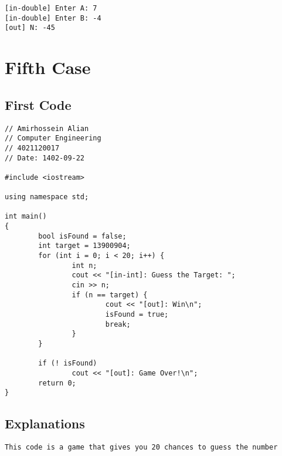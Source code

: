 \documentclass[12pt]{article}
\begin{document}
    \begin{tcolorbox}[breakable, size=fbox, boxrule=1pt, pad at break*=1mm, colback=cellbackground!5!white, colframe=gray!75!black, title=Test Case 3]
\begin{Verbatim}[commandchars=\\\{\}]
[in-double] Enter A: 7
[in-double] Enter B: -4
[out] N: -45
\end{Verbatim}
\end{tcolorbox}

\pagebreak

  \section{Fifth Case}

        \subsection{First Code}
   \begin{tcolorbox}[breakable, size=fbox, boxrule=1pt, pad at break*=1mm, colback=cellbackground, colframe=cellborder]
\begin{verbatim}
// Amirhossein Alian
// Computer Engineering
// 4021120017
// Date: 1402-09-22

#include <iostream>

using namespace std;

int main()
{
        bool isFound = false;
        int target = 13900904;
        for (int i = 0; i < 20; i++) {
                int n;
                cout << "[in-int]: Guess the Target: ";
                cin >> n;
                if (n == target) {
                        cout << "[out]: Win\n";
                        isFound = true;
                        break;
                }
        }

        if (! isFound)
                cout << "[out]: Game Over!\n";
        return 0;
}
\end{verbatim}
\end{tcolorbox}

 	\subsection{Explanations}
    \begin{tcolorbox}[breakable, size=fbox, boxrule=1pt, pad at break*=1mm, colback=cellbackground, colframe=cellborder]
\begin{Verbatim}[commandchars=\\\{\}]
This code is a game that gives you 20 chances to guess the number
\end{Verbatim}
\end{tcolorbox}
\end{document}
